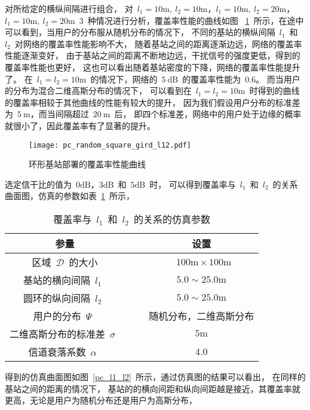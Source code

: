 对所给定的横纵间隔进行组合，
对~$l_1=10\mathrm{m},~l_2=10\mathrm{m}$，$l_1=10\mathrm{m},~l_2=20\mathrm{m}$，
$l_1=10\mathrm{m},~l_2=20\mathrm{m}$~3~种情况进行分析，覆盖率性能的曲线如图
~\ref{pc_random_square_gird_l12}~所示，在途中可以看到，当用户的分布服从随机分布的情况下，
不同的基站的横纵间隔~$l_1$~和~$l_2$~对网络的覆盖率性能影响不大，
随着基站之间的距离逐渐边远，网络的覆盖率性能逐渐变好，
由于基站之间的距离不断地边远，干扰信号的强度更低，得到的覆盖率性能也更好，
这也可以看出随着基站密度的下降，网络的覆盖率性能提升了。
在~$l_1=l_2=10\mathrm{m}$~的情况下，网络的~$5~\mathrm{dB}$~的覆盖率性能为~0.6。
而当用户的分布为混合二维高斯分布的情况下，
可以看到在~$l_1=l_2=10\mathrm{m}$~时得到的曲线的覆盖率相较于其他曲线的性能有较大的提升，
因为我们假设用户分布的标准差为~$5~\mathrm{m}$，而当间隔超过~$20~\mathrm{m}$~后，
即四个标准差，网络中的用户处于边缘的概率就很小了，因此覆盖率有了显著的提升。
\begin{figure}[htbp]
\centering
\texttt{[image: pc\_random\_square\_gird\_l12.pdf]}
\caption{环形基站部署的覆盖率性能曲线}\vspace{-0.5em}
\label{pc_random_square_gird_l12}
\end{figure}
选定信干比的值为~$0\mathrm{dB}$，$3\mathrm{dB}$~和~$5\mathrm{dB}$~时，
可以得到覆盖率与~$l_1$~和~$l_2$~的关系曲面图，仿真的参数如表~\ref{square_grid_pc_para}~所示，
\begin{table}[htbp]
\caption{覆盖率与~$l_1$~和~$l_2$~的关系的仿真参数}
\label{square_grid_pc_para}
\vspace{0.5em}\centering\wuhao
\begin{tabular}{cccc}
\toprule[1.5pt]
参量 & & & 设置 \\
\midrule[0.5pt]
区域~$\mathcal{D}$~的大小  & & & ~$100\mathrm{m} \times 100 \mathrm{m}$ \\
基站的横向间隔~$l_1$~ & & &  $5.0\sim 25.0\mathrm{m}$\\
圆环的纵向间隔~$l_2$~ & & &  $5.0\sim 25.0\mathrm{m}$\\
用户的分布~$\Psi$~ & & & 随机分布，二维高斯分布\\
二维高斯分布的标准差~$\sigma$~ & & & ${5\mathrm{m}}$\\
信道衰落系数~$\alpha$~  & & & 4.0\\
\bottomrule[1.5pt]
\end{tabular}
\end{table}
得到的仿真曲面图如图~\ref{pc_l1_l2}~所示，通过仿真图的结果可以看出，
在同样的基站之间的距离的情况下，
基站的的横向间距和纵向间距越是接近，其覆盖率就更高，无论是用户为随机分布还是用户为高斯分布，

